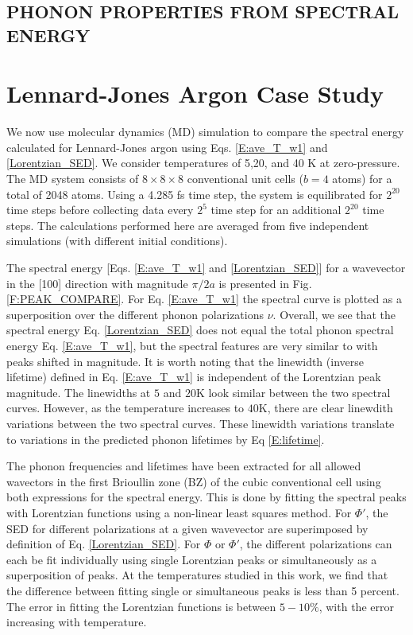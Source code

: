 \documentclass[twocolumn,10pt]{asme2e}
\begin{document}
\subsection*{PHONON PROPERTIES FROM SPECTRAL ENERGY}\label{S:Properties}

\section*{Lennard-Jones Argon Case Study}\label{S:LJ_Case_study}

We now use molecular dynamics (MD) simulation to compare the spectral energy calculated for Lennard-Jones argon \cite{mcgaughey2004c} using Eqs$.$ \eqref{E:ave_T_w1} and \eqref{Lorentzian_SED}. We consider temperatures of 5,20, and 40 K at zero-pressure.  The MD system consists
of $8\times 8\times 8$ conventional unit cells ($b=4$ atoms) for a total of 2048 atoms.
Using a 4.285 fs time step, the system is equilibrated for $2^{20}$ time steps before collecting data every $2^5$ time step for an additional $2^{20}$ time steps. The calculations performed here are averaged from five independent simulations (with different initial conditions).

The spectral energy [Eqs$.$ \eqref{E:ave_T_w1} and \eqref{Lorentzian_SED}] for a wavevector in the [100] direction with magnitude $\pi/2a$ is presented in Fig$.$ \ref{F:PEAK_COMPARE}. For Eq$.$ \eqref{E:ave_T_w1} the spectral curve is plotted as a superposition over the different phonon polarizations $\nu$.  Overall, we see that the spectral energy Eq$.$ \eqref{Lorentzian_SED} does not equal the total phonon spectral energy Eq$.$ \eqref{E:ave_T_w1}, but the spectral features are very similar to with peaks shifted in magnitude. It is worth noting that the linewidth (inverse lifetime) defined in Eq$.$ \eqref{E:ave_T_w1} is independent of the Lorentzian peak magnitude. The linewidths at $5$ and $20$K look similar between the two spectral curves. However, as the temperature increases to $40$K, there are clear linewdith variations between the two spectral curves. These linewidth variations translate to variations in the predicted phonon lifetimes by Eq \eqref{E:lifetime}.

The phonon frequencies and lifetimes have been extracted for all allowed wavectors in the first Brioullin zone (BZ) of the cubic conventional cell using both expressions for the spectral energy. This is done by fitting the spectral peaks with Lorentzian functions using a non-linear least squares method. For $\Phi'$, the SED for different polarizations at a given wavevector are superimposed by definition of Eq$.$ \ref{Lorentzian_SED}. For $\Phi$ or $\Phi'$, the different polarizations can each be fit individually using single Lorentzian peaks or simultaneously as a superposition of peaks. At the temperatures studied in this work, we find that the difference between fitting single or simultaneous peaks is less than 5 percent. The error in fitting the Lorentzian functions is between $5-10\%$, with the error increasing with temperature.
\end{document}
